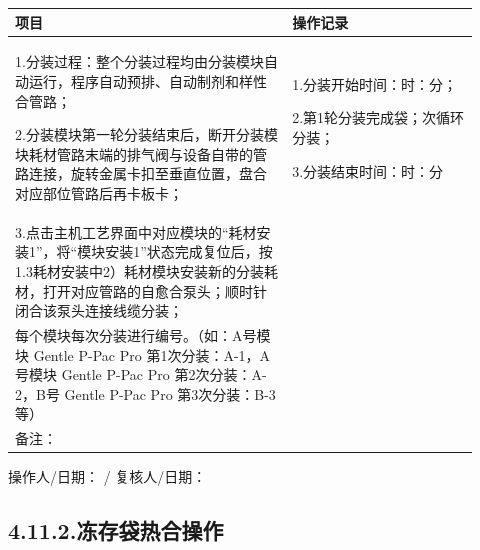 \documentclass[UTF8,10pt,a4paper,fontset=fandol]{ctexart}
\newcommand{\handwritten}[1]{#1}
\begin{document}
\begin{center}
\small
\begin{tabular}{|p{0.55\linewidth}|p{0.37\linewidth}|}
\hline
\centering 项目 & \centering 操作记录 \tabularnewline
\hline
1.分装过程：整个分装过程均由分装模块自动运行，程序自动预排、自动制剂和样性合管路；\par
2.分装模块第一轮分装结束后，断开分装模块耗材管路末端的排气阀与设备自带的管路连接，旋转金属卡扣至垂直位置，盘合对应部位管路后再卡板卡；
&
1.分装开始时间：\underline{\hspace{0.6cm}}时：\underline{\hspace{0.6cm}}分；\par
2.第1轮分装完成\underline{\hspace{0.7cm}}袋；次循环分装；\par
3.分装结束时间：\underline{\hspace{0.6cm}}时：\underline{\hspace{0.6cm}}分
\tabularnewline
\hline
3.点击主机工艺界面中对应模块的“耗材安装1”，将“模块安装1”状态完成复位后，按1.3耗材安装中2）耗材模块安装新的分装耗材，打开对应管路的自愈合泵头；顺时针闭合该泵头连接线缆分装；
&
\tabularnewline
\hline
每个模块每次分装进行编号。（如：A号模块 Gentle P-Pac Pro 第1次分装：A-1，A号模块 Gentle P-Pac Pro 第2次分装：A-2，B号 Gentle P-Pac Pro 第3次分装：B-3等）
&
\tabularnewline
\hline
备注：
&
\tabularnewline
\hline
\end{tabular}
\end{center}

\handwritten{}

操作人/日期：\underline{\hspace{2.2cm}}
\hfill
\handwritten{/}
复核人/日期：\underline{\hspace{2.2cm}}

\subsection*{4.11.2.\quad 冻存袋热合操作}
\end{document}
